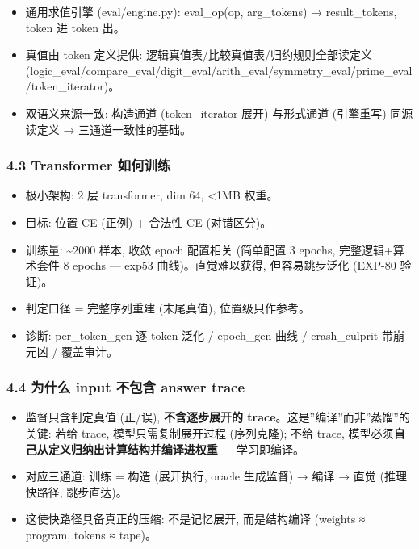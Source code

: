 \documentclass[
]{article}
\providecommand{\tightlist}{%
  \setlength{\itemsep}{0pt}\setlength{\parskip}{0pt}}
\begin{document}
\begin{itemize}
\tightlist
\item
  通用求值引擎 (eval/engine.py): eval\_op(op, arg\_tokens) →
  result\_tokens, token 进 token 出。
\item
  真值由 token 定义提供: 逻辑真值表/比较真值表/归约规则全部读定义
  (logic\_eval/compare\_eval/digit\_eval/arith\_eval/symmetry\_eval/prime\_eval/token\_iterator)。
\item
  双语义来源一致: 构造通道 (token\_iterator 展开) 与形式通道 (引擎重写)
  同源读定义 → 三通道一致性的基础。
\end{itemize}

\subsubsection{4.3 Transformer
如何训练}\label{transformer-ux5982ux4f55ux8badux7ec3}

\begin{itemize}
\tightlist
\item
  极小架构: 2 层 transformer, dim 64, \textless1MB 权重。
\item
  目标: 位置 CE (正例) + 合法性 CE (对错区分)。
\item
  训练量: \textasciitilde2000 样本, 收敛 epoch 配置相关 (简单配置 3
  epochs, 完整逻辑+算术套件 8 epochs --- exp53 曲线)。直觉难以获得,
  但容易跳步泛化 (EXP-80 验证)。
\item
  判定口径 = 完整序列重建 (末尾真值), 位置级只作参考。
\item
  诊断: per\_token\_gen 逐 token 泛化 / epoch\_gen 曲线 / crash\_culprit
  带崩元凶 / 覆盖审计。
\end{itemize}

\subsubsection{4.4 为什么 input 不包含 answer
trace}\label{ux4e3aux4ec0ux4e48-input-ux4e0dux5305ux542b-answer-trace}

\begin{itemize}
\tightlist
\item
  监督只含判定真值 (正/误), \textbf{不含逐步展开的
  trace}。这是''编译''而非''蒸馏''的关键: 若给 trace,
  模型只需复制展开过程 (序列克隆); 不给 trace,
  模型必须\textbf{自己从定义归纳出计算结构并编译进权重} --- 学习即编译。
\item
  对应三通道: 训练 = 构造 (展开执行, oracle 生成监督) → 编译 → 直觉
  (推理快路径, 跳步直达)。
\item
  这使快路径具备真正的压缩: 不是记忆展开, 而是结构编译 (weights ≈
  program, tokens ≈ tape)。
\end{itemize}
\end{document}
